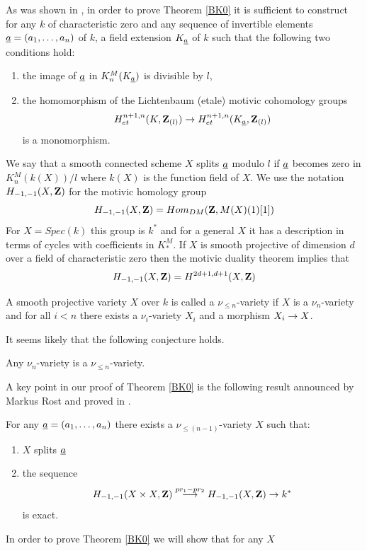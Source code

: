 \documentclass[11pt]{article}
\begin{document}
As was shown in \cite[pp.96-97]{MCpub}, in order to prove Theorem \ref{BK0} it is
sufficient to construct for any $k$ of characteristic zero and any
sequence of invertible elements $\underline{a}=(a_1,\dots,a_n)$ of $k$, a
field extension $K_{\underline{a}}$ of $k$ such that the following two
conditions hold:
%
\begin{enumerate}
\item the image of $\underline{a}$ in $K_n^M(K_{\underline{a}})$ is divisible by
$l$,
\item the homomorphism of the Lichtenbaum (etale) motivic cohomology
groups
%
$$H^{n+1,n}_{et}(K,{\bf Z\rm}_{(l)})\rightarrow
H^{n+1,n}_{et}(K_{\underline{a}},{\bf Z\rm}_{(l)})$$
%
is a monomorphism.
\end{enumerate}
%
We say that a smooth connected scheme $X$ splits $\underline{a}$ modulo $l$
if $\underline{a}$ becomes zero in $K_n^M(k(X))/l$ where $k(X)$ is the
function field of $X$. We use
the notation $H_{-1,-1}(X,{\bf Z\rm})$ for the motivic homology group
%
$$H_{-1,-1}(X,{\bf Z\rm})=Hom_{DM}({\bf Z\rm},M(X)(1)[1])$$
%
For $X=Spec(k)$ this group is $k^*$ and for a general $X$ it has a
description in terms of cycles with coefficients in $K^M_*$. If $X$ is
smooth projective of dimension $d$ over a field of characteristic zero
then the motivic duality theorem implies that
%
$$H_{-1,-1}(X,{\bf Z\rm})=H^{2d+1,d+1}(X,{\bf Z\rm})$$
%
%
\begin{definition}
 A smooth projective variety $X$ over $k$ is called a
$\nu_{\le n}$-variety if $X$ is a $\nu_n$-variety and for all $i< n$
there exists a $\nu_i$-variety $X_i$ and a morphism $X_i\rightarrow X$.
\end{definition}
%
It seems likely that the following conjecture holds.
%
\begin{conjecture}
Any $\nu_n$-variety is a $\nu_{\le n}$-variety.
\end{conjecture}
%
A key point in our proof of Theorem \ref{BK0}
is the following result announced by Markus Rost and proved in \cite{SJ}.
%
\begin{theorem}
 For any $\underline{a}=(a_1,\dots,a_n)$ there exists a
$\nu_{\le (n-1)}$-variety $X$ such that:
%
\begin{enumerate}
\item $X$ splits $\underline{a}$
\item the sequence
%
$$H_{-1,-1}(X\times X,{\bf Z\rm})\stackrel{pr_1-pr_2}{\longrightarrow}
H_{-1,-1}(X,{\bf Z\rm})\rightarrow k^*$$
%
is exact.
\end{enumerate}
\end{theorem}
%
In order to prove Theorem \ref{BK0} we will show that for any $X$
\end{document}
